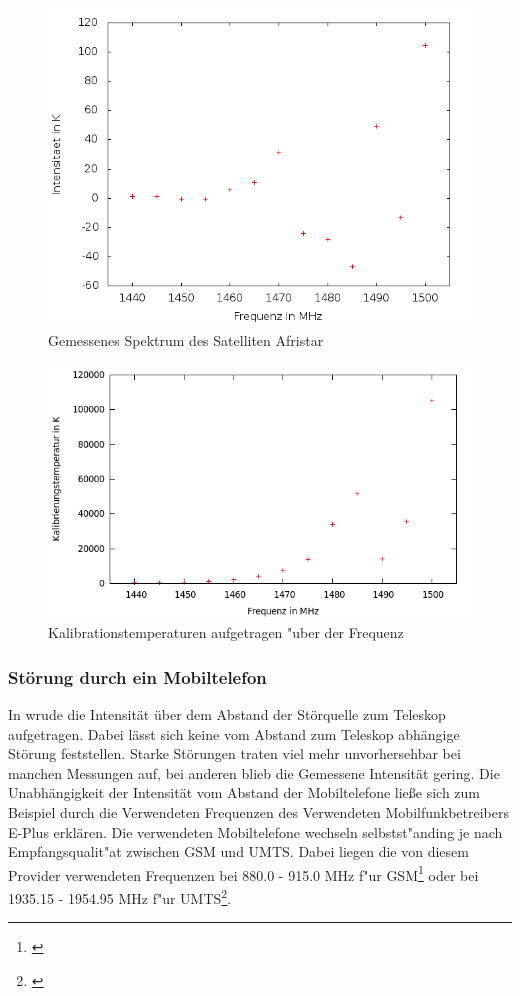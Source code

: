 \begin{figure}
\includegraphics[width=.8\textwidth]{images/spekt_afri}
\caption{Gemessenes Spektrum des Satelliten Afristar}
\label{plot:afri}
\end{figure}
\begin{figure}
\includegraphics[width=.8\textwidth]{images/temp_spekt_afri}
\caption{Kalibrationstemperaturen aufgetragen "uber der Frequenz }
\label{temp_afri}
\end{figure}
\subsubsection{Störung durch ein Mobiltelefon}
In  wrude die Intensität über dem Abstand der Störquelle zum Teleskop aufgetragen. Dabei lässt sich keine vom Abstand zum Teleskop abhängige Störung feststellen. Starke Störungen traten viel mehr unvorhersehbar bei manchen Messungen auf, bei anderen blieb die Gemessene Intensität gering.
Die Unabhängigkeit der Intensität vom Abstand der Mobiltelefone ließe sich zum Beispiel durch die Verwendeten Frequenzen des Verwendeten Mobilfunkbetreibers E-Plus erklären. Die verwendeten Mobiltelefone wechseln selbstst"anding je nach Empfangsqualit"at zwischen GSM und UMTS. Dabei liegen die von diesem Provider verwendeten Frequenzen bei 880.0 - 915.0 MHz f"ur GSM\footnote{\cite{gsm}} oder bei 1935.15 - 1954.95 MHz f"ur UMTS\footnote{\cite{umts}}. 

